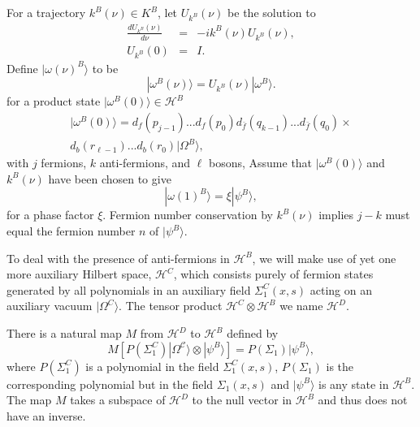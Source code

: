 \documentclass[twocolumn,amsmath,amssymb]{revtex4-1}
\begin{document}
For a trajectory $k^B(\nu) \in K^B$, let $U_{k^B}(\nu)$ be the solution to 
\begin{subequations}
\begin{eqnarray}
\label{udoty}
\frac{dU_{k^B}(\nu)}{d \nu} & = &-i k^B( \nu) U_{k^B}( \nu), \\
\label{uboundary0y}
U_{k^B}( 0) & = & I.
\end{eqnarray}
\end{subequations}
Define $|\omega(\nu)^B \rangle $ to be 
\begin{equation}
\label{omegaofty}
|\omega^B( \nu) \rangle  = U_{k^B}(\nu)|\omega^B \rangle.
\end{equation}
for a product state $|\omega^B(0) \rangle  \in \mathcal{H}^B$
\begin{multline}
\label{productstate2}
|\omega^B(0) \rangle  =
d_f( p_{j - 1}) ... d_f( p_0)   d_{\bar{f}}( q_{k - 1}) ... d_{\bar{f}}( q_0) \times \\
  d_b( r_{\ell-1}) ... d_b( r_0)  |\Omega^B \rangle ,
\end{multline}
with $j$ fermions, $k$ anti-fermions, and $\ell$ bosons,
Assume that $|\omega^B(0) \rangle$ and $k^B(\nu)$ have been chosen
to give
\begin{equation}
\label{upsiphi1y}
|\omega(1)^B \rangle  = \xi |\psi^B \rangle , 
\end{equation}
for a phase factor $\xi$.
Fermion number conservation by $k^B(\nu)$ implies $j - k$ must equal the
fermion number $n$ of $|\psi^B \rangle $.

To deal with the presence of anti-fermions in  $\mathcal{H}^B$,
we will make use of yet one more auxiliary Hilbert space,
$\mathcal{H}^C$, which consists purely 
of fermion states generated by all polynomials
in an auxiliary field $\Sigma^C_1(x,s)$ acting on an auxiliary vacuum $|\Omega^C \rangle $.
The tensor product $\mathcal{H}^C \otimes \mathcal{H}^B$ we name $\mathcal{H}^D$.

There is
a natural map $M$ from $\mathcal{H}^D$ to
$\mathcal{H}^B$ defined by
\begin{equation}
  \label{defM}
  M [ P( \Sigma_1^C) |\Omega^\mathcal{C} \rangle  \otimes |\psi^B \rangle ] = P( \Sigma_1) |\psi^B \rangle ,
\end{equation}
where $P( \Sigma_1^C)$ is a polynomial in the field $\Sigma_1^C(x, s)$,
$P( \Sigma_1)$ is the corresponding polynomial but in the field $\Sigma_1(x, s)$ and
$|\psi^B \rangle $ is any state in $\mathcal{H}^B$.
The map $M$ takes a subspace of $\mathcal{H}^D$ to the null vector in $\mathcal{H}^B$ and
thus does not have an inverse. 
\end{document}
